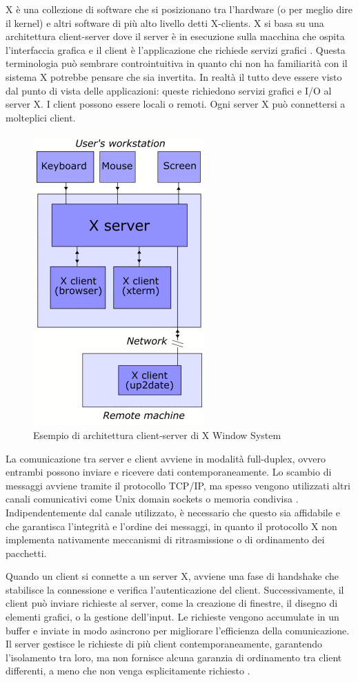 \documentclass[12pt,a4paper,openright,twoside]{book}
\begin{document}
X è una collezione di software che si posizionano tra l'hardware (o per meglio dire il kernel) e altri software di più alto livello detti X-clients. X si basa su una architettura client-server dove il server è in esecuzione sulla macchina che ospita l'interfaccia grafica e il client è l'applicazione che richiede servizi grafici \cite{scheifler1986x}. Questa terminologia può sembrare controintuitiva in quanto chi non ha familiarità con il sistema X potrebbe pensare che sia invertita. In realtà il tutto deve essere visto dal punto di vista delle applicazioni: queste richiedono servizi grafici e I/O al server X.
I client possono essere locali o remoti. Ogni server X può connettersi a molteplici client.
\begin{figure}
    \centering
    \includegraphics[width=.3\linewidth]{figures/X_client_server_example.png}
    \caption[xarch]{Esempio di architettura client-server di X Window System \footnotemark}
\end{figure}

La comunicazione tra server e client avviene in modalità full-duplex, ovvero entrambi possono inviare e ricevere dati contemporaneamente. Lo scambio di messaggi avviene tramite il protocollo TCP/IP, ma spesso vengono utilizzati altri canali comunicativi come Unix domain sockets o memoria condivisa \cite{coopersmith2024x}. Indipendentemente dal canale utilizzato, è necessario che questo sia affidabile e che garantisca l'integrità e l'ordine dei messaggi, in quanto il protocollo X non implementa nativamente meccanismi di ritrasmissione o di ordinamento dei pacchetti.

Quando un client si connette a un server X, avviene una fase di handshake che stabilisce la connessione e verifica l'autenticazione del client. Successivamente, il client può inviare richieste al server, come la creazione di finestre, il disegno di elementi grafici, o la gestione dell'input. Le richieste vengono accumulate in un buffer e inviate in modo asincrono per migliorare l'efficienza della comunicazione. Il server gestisce le richieste di più client contemporaneamente, garantendo l'isolamento tra loro, ma non fornisce alcuna garanzia di ordinamento tra client differenti, a meno che non venga esplicitamente richiesto \cite{coopersmith2024x}.
\end{document}
